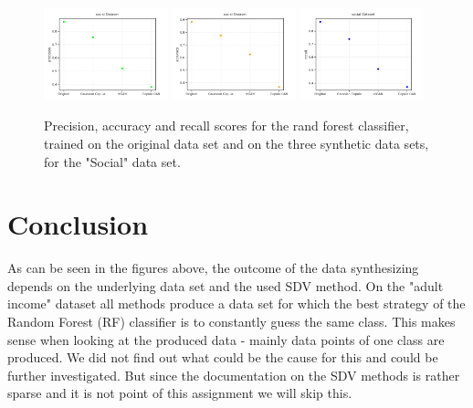 \documentclass{article}
\begin{document}
\begin{figure}[h!]
	\centering
	\includegraphics[width=0.32\textwidth]{../plots/results/social_precision.png}
	\includegraphics[width=0.32\textwidth]{../plots/results/social_accuracy.png}
	\includegraphics[width=0.32\textwidth]{../plots/results/social_recall.png}

	\caption{Precision, accuracy and recall scores for the rand forest classifier, trained on the original data set and on the three synthetic data sets, for the "Social" data set.}
	\label{scores_social}
\end{figure}




\clearpage
\section{Conclusion}

As can be seen in the figures above, the outcome of the data synthesizing depends on the underlying data set and the used SDV method. On the "adult income" dataset all methods produce a data set for which the best strategy of the Random Forest (RF) classifier is to constantly guess the same class. This makes sense when looking at the produced data - mainly data points of one class are produced. We did not find out what could be the cause for this and could be further investigated. But since the documentation on the SDV methods is rather sparse and it is not point of this assignment we will skip this. \\
\end{document}
